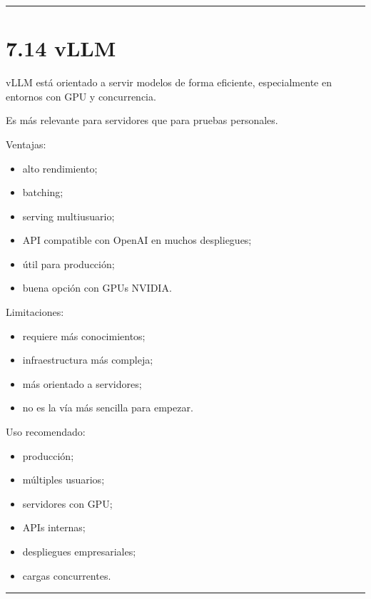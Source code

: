 \begin{center}\rule{0.5\linewidth}{0.5pt}\end{center}

\section{7.14 vLLM}\label{vllm}

vLLM está orientado a servir modelos de forma eficiente, especialmente
en entornos con GPU y concurrencia.

Es más relevante para servidores que para pruebas personales.

Ventajas:

\begin{itemize}
\tightlist
\item
  alto rendimiento;
\item
  batching;
\item
  serving multiusuario;
\item
  API compatible con OpenAI en muchos despliegues;
\item
  útil para producción;
\item
  buena opción con GPUs NVIDIA.
\end{itemize}

Limitaciones:

\begin{itemize}
\tightlist
\item
  requiere más conocimientos;
\item
  infraestructura más compleja;
\item
  más orientado a servidores;
\item
  no es la vía más sencilla para empezar.
\end{itemize}

Uso recomendado:

\begin{itemize}
\tightlist
\item
  producción;
\item
  múltiples usuarios;
\item
  servidores con GPU;
\item
  APIs internas;
\item
  despliegues empresariales;
\item
  cargas concurrentes.
\end{itemize}

\begin{center}\rule{0.5\linewidth}{0.5pt}\end{center}

